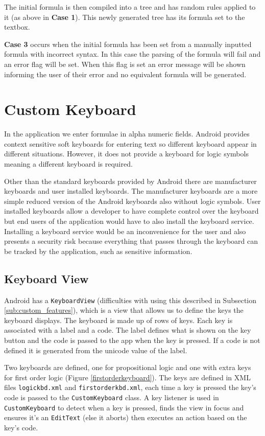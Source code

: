 \documentclass[draft]{report}
\begin{document}
The initial formula is then compiled into a tree and has random rules applied to it (as above in \textbf{Case 1}). This newly generated tree has its formula set to the textbox.

\textbf{Case 3} occurs when the initial formula has been set from a manually inputted formula with incorrect syntax. In this case the parsing of the formula will fail and an error flag will be set. When this flag is set an error message will be shown informing the user of their error and no equivalent formula will be generated.

\section{Custom Keyboard}
\label{sec:custom_keyboard}

In the application we enter formulae in alpha numeric fields. Android provides context sensitive soft keyboards for entering text so different keyboard appear in different situations. However, it does not provide a keyboard for logic symbols meaning a different keyboard is required.

Other than the standard keyboards provided by Android there are manufacturer keyboards and user installed keyboards. The manufacturer keyboards are a more simple reduced version of the Android keyboards also without logic symbols. User installed keyboards allow a developer to have complete control over the keyboard but end users of the application would have to also install the keyboard service. Installing a keyboard service would be an inconvenience for the user and also presents a security risk because everything that passes through the keyboard can be tracked by the application, such as sensitive information. 

\subsection{Keyboard View}

Android has a {\tt KeyboardView} (difficulties with using this described in Subsection \ref{sub:custom_features}), which is a view that allows us to define the keys the keyboard displays. The keyboard is made up of rows of keys. Each key is associated with a label and a code. The label defines what is shown on the key button and the code is passed to the app when the key is pressed. If a code is not defined it is generated from the unicode value of the label.

Two keyboards are defined, one for propositional logic and one with extra keys for first order logic (Figure \ref{firstorderkeyboard}). The keys are defined in XML files {\tt logickbd.xml} and {\tt firstorderkbd.xml}, each time a key is pressed the key's code is passed to the {\tt CustomKeyboard} class. A key listener is used in {\tt CustomKeyboard} to detect when a key is pressed, finds the view in focus and ensures it's an {\tt EditText} (else it aborts) then executes an action based on the key's code.
\end{document}
